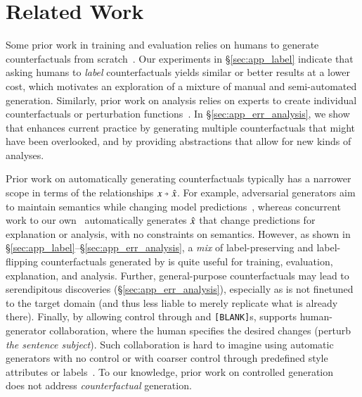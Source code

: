 \section{Related Work}
\label{sec:relate}

Some prior work in training and evaluation relies on humans to generate counterfactuals from scratch~\cite{gardner2020contrast, teney2020learning, kaushik2019learning}. 
Our experiments in \S\ref{sec:app_label} indicate that asking humans to \emph{label} \sysname{} counterfactuals yields similar or better results at a lower cost, which motivates an exploration of a mixture of manual and semi-automated generation. 
Similarly, prior work on analysis relies on experts to create individual counterfactuals or perturbation functions~\cite{wu2019errudite, checklist:acl20}. 
In \S\ref{sec:app_err_analysis}, we show that \sysname{} enhances current practice by generating multiple counterfactuals that might have been overlooked, and by providing abstractions that allow for new kinds of analyses.

Prior work on automatically generating counterfactuals typically has a narrower scope in terms of the relationships $x \veryshortarrow \xp$.
For example, adversarial generators aim to maintain semantics while changing model predictions~\cite{ribeiro2018semantically, iyyer2018adversarial, li2020contextualized}, whereas concurrent work to our own~\cite{madaan2020generate, ross2020explaining} automatically generates $\hat{x}$ that change predictions for explanation or analysis, with no constraints on semantics.
However, as shown in \S\ref{sec:app_label}--\S\ref{sec:app_err_analysis}, a \emph{mix} of label-preserving and label-flipping counterfactuals generated by \sysname is quite useful for training, evaluation, explanation, and analysis. 
Further, general-purpose counterfactuals may lead to serendipitous discoveries (\S\ref{sec:app_err_analysis}), especially as \sysname is not finetuned to the target domain (and thus less liable to merely replicate what is already there).
Finally, by allowing control through \tagstrs and \texttt{[BLANK]}s, \sysname{} supports human-generator collaboration, where the human specifies the desired changes (\eg perturb \emph{the sentence subject}).
Such collaboration is hard to imagine using automatic generators with no control or with coarser control through predefined style attributes or labels~\cite{madaan-etal-2020-politeness, malmi-etal-2020-unsupervised}. To our knowledge, prior work on controlled generation~\cite{ctrl, pplm} does not address \emph{counterfactual} generation.


